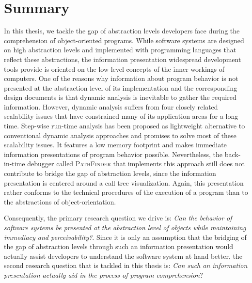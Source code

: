 \section{Summary}
\label{s:ConclusionsSummary}
In this thesis, we tackle the gap of abstraction levels developers face during the comprehension of object-oriented programs.
While software systems are designed on high abstraction levels and implemented with programming languages that reflect these abstractions, the information presentation widespread development tools provide is oriented on the low level concepts of the inner workings of computers.
One of the reasons why information about program behavior is not presented at the abstraction level of its implementation and the corresponding design documents is that dynamic analysis is inevitable to gather the required information.
However, dynamic analysis suffers from four closely related scalability issues that have constrained many of its application areas for a long time.
Step-wise run-time analysis has been proposed as lightweight alternative to conventional dynamic analysis approaches and promises to solve most of these scalability issues.
It features a low memory footprint and makes immediate information presentations of program behavior possible.
Nevertheless, the back-in-time debugger called \textsc{PathFinder} that implements this approach still does not contribute to bridge the gap of abstraction levels, since the information presentation is centered around a call tree visualization.
Again, this presentation rather conforms to the technical procedures of the execution of a program than to the abstractions of object-orientation.

Consequently, the primary research question we drive is: \textit{Can the behavior of software systems be presented at the abstraction level of objects while maintaining immediacy and perceivability?}.
Since it is only an assumption that the bridging of the gap of abstraction levels through such an information presentation would actually assist developers to understand the software system at hand better, the second research question that is tackled in this thesis is:
\textit{Can such an information presentation actually aid in the process of program comprehension}?


